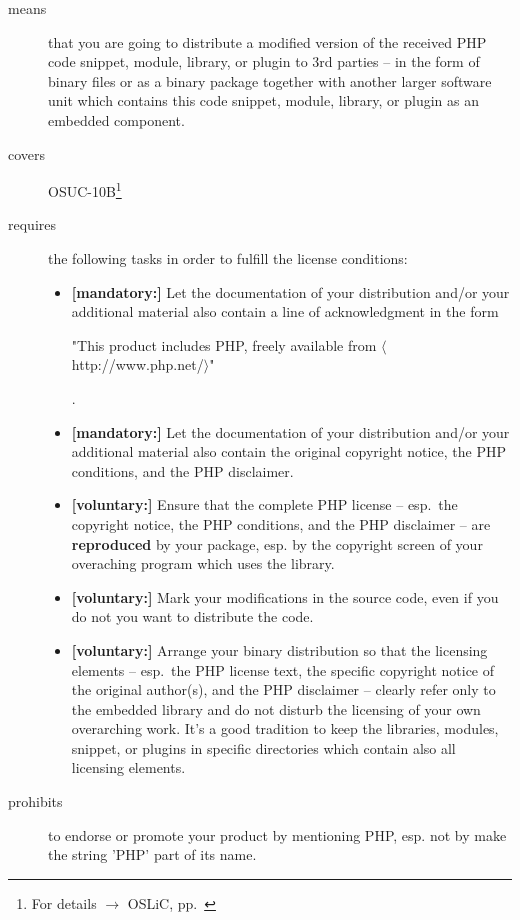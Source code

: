 \begin{description}
\item[means] that you are going to distribute a modified version of the received
PHP code snippet, module, library, or plugin to 3rd parties -- in the form of
binary files or as a binary package together with another larger software unit
which contains this code snippet, module, library, or plugin as an embedded
component.
\item[covers] OSUC-10B\footnote{For details $\rightarrow$ OSLiC, pp.\
\pageref{OSUC-10B-DEF}}
\item[requires] the following tasks in order to fulfill the license conditions:
\begin{itemize}

  \item \textbf{[mandatory:]} Let the documentation of your distribution and/or
  your additional material also contain a line of acknowledgment in the form
  \begin{footnotesize}"This product includes PHP, freely available from
  $\langle$http://www.php.net/$\rangle$"\end{footnotesize}.
    
  \item \textbf{[mandatory:]} Let the documentation of your distribution and/or
  your additional material also contain the original copyright notice, the PHP
  conditions, and the PHP disclaimer.

  \item \textbf{[voluntary:]} Ensure that the complete PHP license -- esp.\ the
  copyright notice, the PHP conditions, and the PHP disclaimer -- are
  \textbf{reproduced} by your package, esp. by the copyright screen of your
  overaching program which uses the library.
    
  \item \textbf{[voluntary:]} Mark your modifications in the source code,
  even if you do not you want to distribute the code.
  
  \item \textbf{[voluntary:]} Arrange your binary distribution so that the
  licensing elements -- esp.\ the PHP license text, the specific copyright
  notice of the original author(s), and the PHP disclaimer -- clearly refer
  only to the embedded library and do not disturb the licensing of your own
  overarching work. It's a good tradition to keep the libraries, modules,
  snippet, or plugins in specific directories which contain also all licensing
  elements.
\end{itemize}

\item[prohibits] to endorse or promote your product by mentioning PHP, esp. not
by make the string 'PHP' part of its name.

\end{description}

